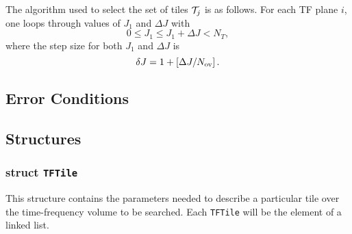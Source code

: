 The algorithm used to select the set of tiles ${\cal T}_j$ is as
follows.  For each TF plane $i$, one loops through values of $J_1$
and $\Delta J$ with
\begin{equation}
0 \le J_1 \le J_1 + \Delta J < N_T,
\end{equation}
where the step size for both $J_1$ and $\Delta J$ is
\begin{equation}
\delta J = 1 + \left[\Delta J / N_{\rm ov} \right].
\end{equation}

\subsection*{Error Conditions}


\subsection*{Structures}

\subsubsection*{struct \texttt{TFTile}}

\noindent This structure contains the parameters needed to describe a
particular tile over the time-frequency volume to be searched.  Each
\verb+TFTile+ will be the element of a linked list. 

